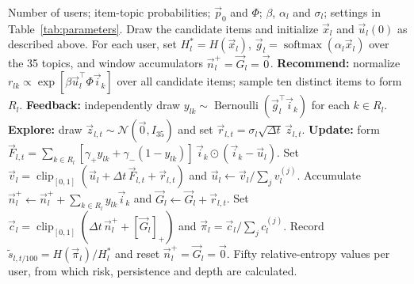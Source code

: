 \begin{algorithm}[H]
\caption{Simulation of recommendation, feedback and exploration.}\label{alg:simulation}
\small
\begin{algorithmic}[1]
\Require Number of users; item-topic probabilities; $\vec{p}_0$ and $\Phi$; $\beta$, $\alpha_l$ and $\sigma_l$; settings in Table~\ref{tab:parameters}.
\State Draw the candidate items and initialize $\vec{x}_l$ and $\vec{u}_l(0)$ as described above.
\State For each user, set $H_l^*=H(\vec{x}_l)$, $\vec{g}_l=\operatorname{softmax}(\alpha_l\vec{x}_l)$ over the 35 topics, and window accumulators $\vec{n}_l^+=\vec{G}_l=\vec{0}$.
        \State \textbf{Recommend:} normalize $r_{lk}\propto\exp[\beta\vec{u}_l^{\top}\Phi\vec{i}_k]$ over all candidate items; sample ten distinct items to form $R_l$.
        \State \textbf{Feedback:} independently draw $y_{lk}\sim\operatorname{Bernoulli}(\vec{g}_l^{\top}\vec{i}_k)$ for each $k\in R_l$.
        \State \textbf{Explore:} draw $\vec{z}_{l,t}\sim\mathcal{N}(\vec{0},I_{35})$ and set $\vec{r}_{l,t}=\sigma_l\sqrt{\Delta t}\,\vec{z}_{l,t}$.
        \State \textbf{Update:} form $\vec{F}_{l,t}=\sum_{k\in R_l}[\gamma_+y_{lk}+\gamma_-(1-y_{lk})]\,\vec{i}_k\odot(\vec{i}_k-\vec{u}_l)$.
        \State Set $\vec{v}_l=\operatorname{clip}_{[0,1]}(\vec{u}_l+\Delta t\,\vec{F}_{l,t}+\vec{r}_{l,t})$ and $\vec{u}_l\leftarrow\vec{v}_l/\sum_jv_l^{(j)}$.
        \State Accumulate $\vec{n}_l^+\leftarrow\vec{n}_l^++\sum_{k\in R_l}y_{lk}\vec{i}_k$ and $\vec{G}_l\leftarrow\vec{G}_l+\vec{r}_{l,t}$.
            \State Set $\vec{c}_l=\operatorname{clip}_{[0,1]}(\Delta t\,\vec{n}_l^++[\vec{G}_l]_+)$ and $\vec{\pi}_l=\vec{c}_l/\sum_jc_l^{(j)}$.
            \State Record $\tilde{s}_{l,t/100}=H(\vec{\pi}_l)/H_l^*$ and reset $\vec{n}_l^+=\vec{G}_l=\vec{0}$.
        \EndIf
    \EndFor
\EndFor
\Ensure Fifty relative-entropy values per user, from which risk, persistence and depth are calculated.
\end{algorithmic}
\end{algorithm}
